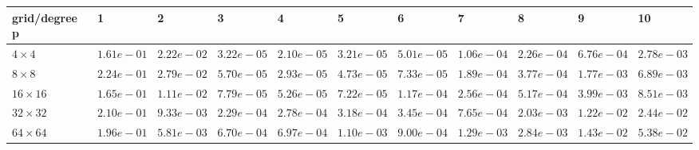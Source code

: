 \begin{tabular}{lllllllllll}
\hline
 grid/degree p   & 1          & 2          & 3          & 4          & 5          & 6          & 7          & 8          & 9          & 10         \\
\hline
 $4 \times 4$    & $1.61e-01$ & $2.22e-02$ & $3.22e-05$ & $2.10e-05$ & $3.21e-05$ & $5.01e-05$ & $1.06e-04$ & $2.26e-04$ & $6.76e-04$ & $2.78e-03$ \\
 $8 \times 8$    & $2.24e-01$ & $2.79e-02$ & $5.70e-05$ & $2.93e-05$ & $4.73e-05$ & $7.33e-05$ & $1.89e-04$ & $3.77e-04$ & $1.77e-03$ & $6.89e-03$ \\
 $16 \times 16$  & $1.65e-01$ & $1.11e-02$ & $7.79e-05$ & $5.26e-05$ & $7.22e-05$ & $1.17e-04$ & $2.56e-04$ & $5.17e-04$ & $3.99e-03$ & $8.51e-03$ \\
 $32 \times 32$  & $2.10e-01$ & $9.33e-03$ & $2.29e-04$ & $2.78e-04$ & $3.18e-04$ & $3.45e-04$ & $7.65e-04$ & $2.03e-03$ & $1.22e-02$ & $2.44e-02$ \\
 $64 \times 64$  & $1.96e-01$ & $5.81e-03$ & $6.70e-04$ & $6.97e-04$ & $1.10e-03$ & $9.00e-04$ & $1.29e-03$ & $2.84e-03$ & $1.43e-02$ & $5.38e-02$ \\
\hline
\end{tabular}